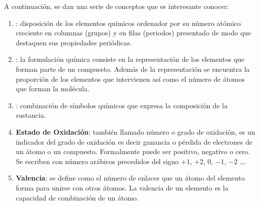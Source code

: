 \documentclass[11pt, a4paper]{article}
\begin{document}
A continuación, se dan una serie de conceptos que es interesante conocer:
\begin{enumerate}[label=\numberballred]
    \item {}: disposición de los elementos químicos ordenador por su número atómico creciente en columnas (grupos) y en filas (periodos) presentado de modo que destaquen sus propiedades periódicas.
    \item {}: la formulación química consiste en la representación de los elementos que forman parte de un compuesto. Además de la representación se encuentra la proporción de los elementos que intervienen así como el número de átomos que forman la molécula.
    \item {}: combinación de símbolos químicos que expresa la composición de la sustancia.
    \item \textbf{Estado de Oxidación}: también llamado número o grado de oxidación, es un indicador del grado de oxidación es decir ganancia o pérdida de electrones de un átomo o un compuesto. Formalmente puede ser positivo, negativo o cero. Se escriben con número arábicos precedidos del signo \(+1\), $+2$, $0$, $-1$, $-2$ \dots.
    \item \textbf{Valencia}: se define como el número de enlaces que un átomo del elemento forma para unirse con otros átomos. La valencia de un elemento es la capacidad de combinación de un átomo.
\end{enumerate}
\end{document}
